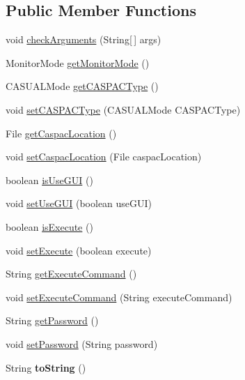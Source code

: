 \subsection*{Public Member Functions}
\begin{DoxyCompactItemize}
\item 
void \hyperlink{class_c_a_s_u_a_l_1_1_c_a_s_u_a_l_settings_a218016268b33abe643b5275772592d8f}{check\-Arguments} (String\mbox{[}$\,$\mbox{]} args)
\item 
Monitor\-Mode \hyperlink{class_c_a_s_u_a_l_1_1_c_a_s_u_a_l_settings_af9567a2e0983f0ae94ad23d765440169}{get\-Monitor\-Mode} ()
\item 
C\-A\-S\-U\-A\-L\-Mode \hyperlink{class_c_a_s_u_a_l_1_1_c_a_s_u_a_l_settings_a15576886590ee77855f1be811b13a793}{get\-C\-A\-S\-P\-A\-C\-Type} ()
\item 
void \hyperlink{class_c_a_s_u_a_l_1_1_c_a_s_u_a_l_settings_a8fe84cc161cb8304e71d24062b35b8af}{set\-C\-A\-S\-P\-A\-C\-Type} (C\-A\-S\-U\-A\-L\-Mode C\-A\-S\-P\-A\-C\-Type)
\item 
File \hyperlink{class_c_a_s_u_a_l_1_1_c_a_s_u_a_l_settings_ae2c4b38907d94aa268e0e4f543ae5006}{get\-Caspac\-Location} ()
\item 
void \hyperlink{class_c_a_s_u_a_l_1_1_c_a_s_u_a_l_settings_a0867f521ea9b76f3064c505d1476b607}{set\-Caspac\-Location} (File caspac\-Location)
\item 
boolean \hyperlink{class_c_a_s_u_a_l_1_1_c_a_s_u_a_l_settings_a454587fa6041bb759dd0d7a0b23bf5a4}{is\-Use\-G\-U\-I} ()
\item 
void \hyperlink{class_c_a_s_u_a_l_1_1_c_a_s_u_a_l_settings_a26918079a2d337e1a8185fa448dbf18f}{set\-Use\-G\-U\-I} (boolean use\-G\-U\-I)
\item 
boolean \hyperlink{class_c_a_s_u_a_l_1_1_c_a_s_u_a_l_settings_ae857085b6bae368a62639eccf2c019ba}{is\-Execute} ()
\item 
void \hyperlink{class_c_a_s_u_a_l_1_1_c_a_s_u_a_l_settings_ad577dc8e01ee4a627493b54b1c76fc9c}{set\-Execute} (boolean execute)
\item 
String \hyperlink{class_c_a_s_u_a_l_1_1_c_a_s_u_a_l_settings_a09115e0785645962d0295e2128165b3e}{get\-Execute\-Command} ()
\item 
void \hyperlink{class_c_a_s_u_a_l_1_1_c_a_s_u_a_l_settings_a847516a5dbfe98972b03f13e336ca54e}{set\-Execute\-Command} (String execute\-Command)
\item 
String \hyperlink{class_c_a_s_u_a_l_1_1_c_a_s_u_a_l_settings_aa3f8b41dfd71b5df68b05a376e83d415}{get\-Password} ()
\item 
void \hyperlink{class_c_a_s_u_a_l_1_1_c_a_s_u_a_l_settings_a17905d90a5127a4eb19ec6ca2f29cdcf}{set\-Password} (String password)
\item 
\hypertarget{class_c_a_s_u_a_l_1_1_c_a_s_u_a_l_settings_a56974d8214cf4316b7f2a7e2cf62087a}{String {\bfseries to\-String} ()}\label{class_c_a_s_u_a_l_1_1_c_a_s_u_a_l_settings_a56974d8214cf4316b7f2a7e2cf62087a}

\end{DoxyCompactItemize}


